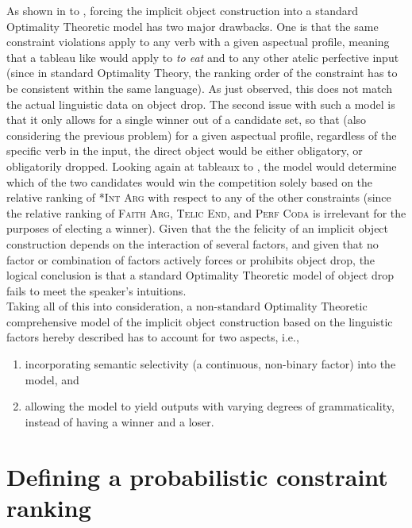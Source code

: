 As shown in  to , forcing the implicit object construction into a standard Optimality Theoretic model has two major drawbacks. One is that the same constraint violations apply to any verb with a given aspectual profile, meaning that a tableau like  would apply to \textit{to eat} and to any other atelic perfective input (since in standard Optimality Theory, the ranking order of the constraint has to be consistent within the same language). As just observed, this does not match the actual linguistic data on object drop. The second issue with such a model is that it only allows for a single winner out of a candidate set, so that (also considering the previous problem) for a given aspectual profile, regardless of the specific verb in the input, the direct object would be either obligatory, or obligatorily dropped. Looking again at tableaux  to , the model would determine which of the two candidates would win the competition solely based on the relative ranking of \textsc{*Int Arg} with respect to any of the other constraints (since the relative ranking of \textsc{Faith Arg}, \textsc{Telic End}, and \textsc{Perf Coda} is irrelevant for the purposes of electing a winner). Given that the the felicity of an implicit object construction depends on the interaction of several factors, and given that no factor or combination of factors actively forces or prohibits object drop, the logical conclusion is that a standard Optimality Theoretic model of object drop fails to meet the speaker's intuitions.\\
Taking all of this into consideration, a non-standard Optimality Theoretic comprehensive model of the implicit object construction based on the linguistic factors hereby described has to account for two aspects, i.e.,
\begin{enumerate}
    \item incorporating semantic selectivity (a continuous, non-binary factor) into the model, and
    \item allowing the model to yield outputs with varying degrees of grammaticality, instead of having a winner and a loser.
\end{enumerate}

\section{Defining a probabilistic constraint ranking} 
